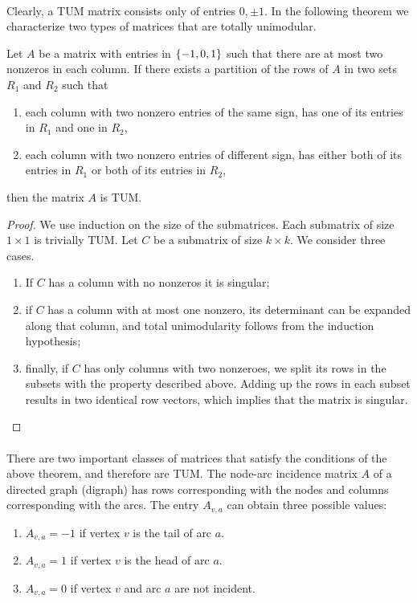 {\paragraph{}
Clearly, a TUM matrix consists only of entries $0,\pm 1$. In the following theorem we characterize two types of matrices that are totally unimodular.
\begin{theorem}
Let $A$ be a matrix with entries in $\left\{ -1, 0, 1 \right\}$ such that there are at most two nonzeros in each column. If there exists a partition of the rows of $A$ in two sets $R_1$ and $R_2$ such that
\begin{enumerate}
 \item each column with two nonzero entries of the same sign, has one of its entries in $R_1$ and one in $R_2$,
 \item each column with two nonzero entries of different sign, has either both of its entries in $R_1$ or both of its entries in $R_2$,
\end{enumerate}
then the matrix $A$ is TUM.
\begin{proof}
We use induction on the size of the submatrices. Each submatrix of size $1\times 1$ is trivially TUM. Let $C$ be a submatrix of size $k\times k$. We consider three cases.
\begin{enumerate}
 \item If $C$ has a column with no nonzeros it is singular;
 \item if $C$ has a column with at most one nonzero, its determinant can be expanded along that column, and total unimodularity follows from the induction hypothesis;
 \item finally, if $C$ has only columns with two nonzeroes, we split its rows in the subsets with the property described above. Adding up the rows in each subset results in two identical row vectors, which implies that the matrix is singular.
\end{enumerate}
\end{proof}
\end{theorem}

\paragraph{}
There are two important classes of matrices that satisfy the conditions of the above theorem, and therefore are TUM. The node-arc incidence matrix $A$ of a directed graph (digraph) has rows corresponding with
the nodes and columns corresponding with the arcs. The entry $A_{v,a}$ can obtain three possible values:
\begin{enumerate}
 \item $A_{v,a}=-1$ if vertex $v$ is the tail of arc $a$.
 \item $A_{v,a}=1$ if vertex $v$ is the head of arc $a$.
 \item $A_{v,a}=0$ if vertex $v$ and arc $a$ are not incident.
\end{enumerate}

}
